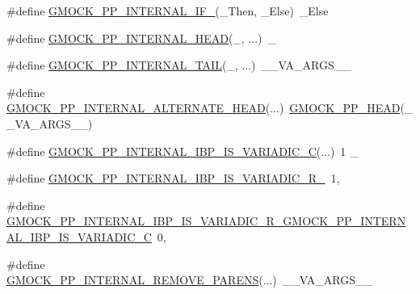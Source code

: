 \begin{DoxyCompactItemize}
\item 
\#define \mbox{\hyperlink{googletest-master_2googlemock_2include_2gmock_2internal_2gmock-pp_8h_afa9219c0158e29914036bfe9959ed0d7}{G\+M\+O\+C\+K\+\_\+\+P\+P\+\_\+\+I\+N\+T\+E\+R\+N\+A\+L\+\_\+\+I\+F\+\_}}(\+\_\+\+Then,  \+\_\+\+Else)~\+\_\+\+Else
\item 
\#define \mbox{\hyperlink{googletest-master_2googlemock_2include_2gmock_2internal_2gmock-pp_8h_a76a2c212a600bad8c26c34343785d070}{G\+M\+O\+C\+K\+\_\+\+P\+P\+\_\+\+I\+N\+T\+E\+R\+N\+A\+L\+\_\+\+H\+E\+AD}}(\+\_, ...)~\+\_
\item 
\#define \mbox{\hyperlink{googletest-master_2googlemock_2include_2gmock_2internal_2gmock-pp_8h_a0e7741e9333e33780a56a8c5e2079942}{G\+M\+O\+C\+K\+\_\+\+P\+P\+\_\+\+I\+N\+T\+E\+R\+N\+A\+L\+\_\+\+T\+A\+IL}}(\+\_, ...)~\+\_\+\+\_\+\+V\+A\+\_\+\+A\+R\+G\+S\+\_\+\+\_\+
\item 
\#define \mbox{\hyperlink{googletest-master_2googlemock_2include_2gmock_2internal_2gmock-pp_8h_a397716c397c91563dfbb9c3b974dc2dc}{G\+M\+O\+C\+K\+\_\+\+P\+P\+\_\+\+I\+N\+T\+E\+R\+N\+A\+L\+\_\+\+A\+L\+T\+E\+R\+N\+A\+T\+E\+\_\+\+H\+E\+AD}}(...)~\mbox{\hyperlink{_obj__test_2lib_2googletest-master_2googlemock_2include_2gmock_2internal_2gmock-pp_8h_ad7910160dfc0fb20b239efcf1f3ddd85}{G\+M\+O\+C\+K\+\_\+\+P\+P\+\_\+\+H\+E\+AD}}(\+\_\+\+\_\+\+V\+A\+\_\+\+A\+R\+G\+S\+\_\+\+\_\+)
\item 
\#define \mbox{\hyperlink{googletest-master_2googlemock_2include_2gmock_2internal_2gmock-pp_8h_a5bec02a24e70c087e6dca52f735356ba}{G\+M\+O\+C\+K\+\_\+\+P\+P\+\_\+\+I\+N\+T\+E\+R\+N\+A\+L\+\_\+\+I\+B\+P\+\_\+\+I\+S\+\_\+\+V\+A\+R\+I\+A\+D\+I\+C\+\_\+C}}(...)~1 \+\_\+
\item 
\#define \mbox{\hyperlink{googletest-master_2googlemock_2include_2gmock_2internal_2gmock-pp_8h_a80e10be13b34c05a5bc4a2db66f6090e}{G\+M\+O\+C\+K\+\_\+\+P\+P\+\_\+\+I\+N\+T\+E\+R\+N\+A\+L\+\_\+\+I\+B\+P\+\_\+\+I\+S\+\_\+\+V\+A\+R\+I\+A\+D\+I\+C\+\_\+\+R\+\_}}~1,
\item 
\#define \mbox{\hyperlink{googletest-master_2googlemock_2include_2gmock_2internal_2gmock-pp_8h_a0415d68018422fd678c14c84e2390142}{G\+M\+O\+C\+K\+\_\+\+P\+P\+\_\+\+I\+N\+T\+E\+R\+N\+A\+L\+\_\+\+I\+B\+P\+\_\+\+I\+S\+\_\+\+V\+A\+R\+I\+A\+D\+I\+C\+\_\+\+R\+\_\+\+G\+M\+O\+C\+K\+\_\+\+P\+P\+\_\+\+I\+N\+T\+E\+R\+N\+A\+L\+\_\+\+I\+B\+P\+\_\+\+I\+S\+\_\+\+V\+A\+R\+I\+A\+D\+I\+C\+\_\+C}}~0,
\item 
\#define \mbox{\hyperlink{googletest-master_2googlemock_2include_2gmock_2internal_2gmock-pp_8h_ac3c1fba05dad44080330c0ecd1208ca6}{G\+M\+O\+C\+K\+\_\+\+P\+P\+\_\+\+I\+N\+T\+E\+R\+N\+A\+L\+\_\+\+R\+E\+M\+O\+V\+E\+\_\+\+P\+A\+R\+E\+NS}}(...)~\+\_\+\+\_\+\+V\+A\+\_\+\+A\+R\+G\+S\+\_\+\+\_\+

\end{DoxyCompactItemize}
